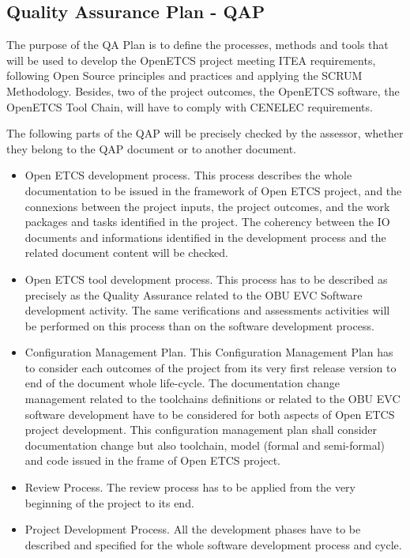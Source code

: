 \documentclass{template/openetcs_report}
\begin{document}
\subsection{Quality Assurance Plan - QAP}
The purpose of the QA Plan is to define the processes, methods and tools that will be used to develop the OpenETCS project meeting ITEA requirements, following Open Source principles and practices and applying the SCRUM Methodology. Besides, two of the project outcomes, the OpenETCS software, the OpenETCS Tool Chain, will have to comply with CENELEC requirements.

The following parts of the QAP will be precisely checked by the assessor, whether they belong to the QAP document or to another document.
\begin{itemize}
\item  Open ETCS development process. This process describes the whole documentation to be issued in the framework of Open ETCS project, and the connexions between the project inputs, the project outcomes, and the work packages and tasks identified in the project. The coherency between the IO documents and informations identified in the development process and the related document content will be checked.
\item  Open ETCS tool development process. This process has to be described as precisely as the Quality Assurance related to the OBU EVC Software development activity. The same verifications and assessments activities will be performed on this process than on the software development process.
\item Configuration Management Plan. This Configuration Management Plan has to consider each outcomes of the project from its very first release version to end of the document whole life-cycle. The documentation change management related to the toolchains definitions or related to the OBU EVC software development have to be considered for both aspects of Open ETCS project development. This configuration management plan shall consider documentation change but also toolchain, model (formal and semi-formal) and code issued in the frame of Open ETCS project.
\item Review Process. The review process has to be applied from the very beginning of the project to its end.
\item Project Development Process. All the development phases have to be described and specified for the whole software development process and cycle.
\end{itemize}
\end{document}
